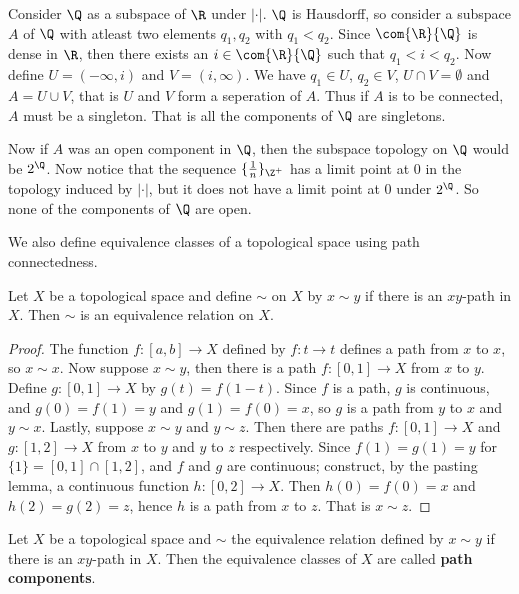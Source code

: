 \begin{example}
    Consider $\Q$ as a subspace of  $\R$ under  $|\cdot|$.  $\Q$ is Hausdorff, so consider
    a subspace  $A$ of  $\Q$ with atleast two elements  $q_1,q_2$ with $ q_1<q_2$.
    Since $\com{\R}{\Q}$ is dense in $\R$, then there exists an
    $i \in \com{\R}{\Q}$ such that $q_1<i<q_2$. Now define $U=(-\infty,i)$
    and $V=(i,\infty)$. We have $ q_1 \in U$, $ q_2 \in V$, $U \cap V=\emptyset$
    and  $A=U \cup V$, that is  $U$ and  $V$ form a seperation of $A$. Thus if
    $A$ is to be connected,  $A$ must be a singleton. That is all the
    components of  $\Q$ are singletons.

    Now if  $A$ was an open component in  $\Q$, then the subspace topology on  $\Q$ would be
    $2^{\Q}$. Now notice that the sequence $\{\frac{1}{n}\}_{\Z^+}$ has a limit point at $0$
    in the topology induced by  $|\cdot|$, but it does not have a limit point at  $0$ under
    $2^{\Q}$. So none of the components of $\Q$ are open.
\end{example}

We also define equivalence classes of a topological space using path connectedness.

\begin{proposition}\label{3.3.4}
    Let $X$ be a topological space and define $\sim$ on $X$ by $x \sim y$ if  there is an $xy$-path
    in  $X$. Then  $\sim$ is an equivalence relation on $X$.
\end{proposition}
\begin{proof}
    The function $f:[a,b] \rightarrow X$ defined by $f:t \rightarrow t$ defines a path from $x$ to
    $x$, so  $x \sim x$. Now suppose  $x \sim y$, then there is a path  $f:[0,1] \rightarrow X$ from
    $x$ to  $y$. Define  $g:[0,1] \rightarrow X$ by $g(t)=f(1-t)$. Since $f$ is a path, $g$ is
    continuous, and $g(0)=f(1)=y$ and $g(1)=f(0)=x$, so $g$ is a path from  $y$ to  $x$ and  $y \sim
    x$. Lastly, suppose  $x \sim y$ and  $y \sim z$. Then there are paths  $f:[0,1] \rightarrow X$
    and $g:[1,2] \rightarrow X$ from $x$ to  $y$ and  $y$ to  $z$ respectively.  Since
    $f(1)=g(1)=y$ for $\{1\}=[0,1] \cap [1,2]$, and $f$ and  $g$ are continuous; construct, by the
    pasting lemma, a continuous function $h:[0,2] \rightarrow X$. Then $h(0)=f(0)=x$ and
    $h(2)=g(2)=z$, hence $h$ is a path from $x$ to  $z$. That is  $x \sim z$.
\end{proof}

\begin{definition}
    Let $X$ be a topological space and  $\sim$ the equivalence relation defined by  $x \sim y$ if
    there is an  $xy$-path in  $X$. Then the equivalence classes of  $X$ are called \textbf{path
    components}.
\end{definition}

